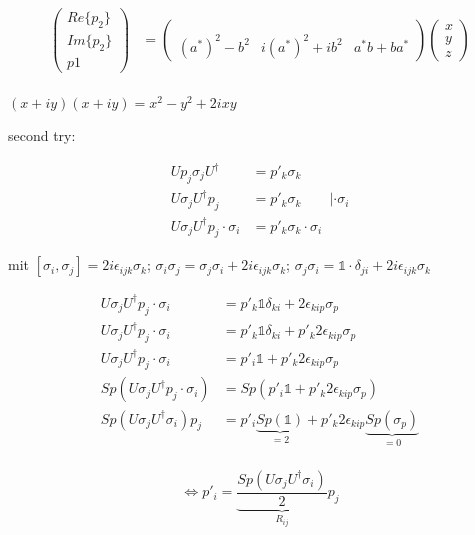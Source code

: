 \begin{enumerate}
\begin{align}
\begin{pmatrix}Re\{p_2\}\\Im\{p_2\}\\p1\end{pmatrix} &=
\begin{pmatrix} & & \\ & & \\(a^*)^2-b^2 &i(a^*)^2+ib^2 & a^*b+ba^*\end{pmatrix}
\begin{pmatrix}x\\y\\z\end{pmatrix} \\
\end{align}

\((x+iy)(x+iy) = x^2-y^2+2ixy\) 


second try:


\begin{align}
Up_j\sigma_j U^\dagger &= p'_k\sigma_k \\
U\sigma_j U^\dagger p_j &= p'_k\sigma_k\qquad |\cdot \sigma_i \\
U\sigma_j U^\dagger p_j \cdot \sigma_i &= p'_k\sigma_k\cdot \sigma_i
\end{align}

mit \([\sigma_i,\sigma_j]=2i\epsilon_{ijk}\sigma_k\);  \(\sigma_i\sigma_j=\sigma_j\sigma_i+2i\epsilon_{ijk}\sigma_k\); \(\sigma_j\sigma_i = \mathbb 1\cdot \delta_{ji}+2i\epsilon_{ijk}\sigma_k\)

\begin{align}
U\sigma_j U^\dagger p_j \cdot \sigma_i &= p'_k\mathbb 1 \delta_{ki}+2\epsilon_{kip}\sigma_p\\
U\sigma_j U^\dagger p_j \cdot \sigma_i &= p'_k\mathbb 1 \delta_{ki}+p'_k2\epsilon_{kip}\sigma_p\\
U\sigma_j U^\dagger p_j \cdot \sigma_i &= p'_i\mathbb 1 + p'_k2\epsilon_{kip}\sigma_p\\
Sp(U\sigma_j U^\dagger p_j \cdot \sigma_i) &= Sp(p'_i\mathbb 1 + p'_k2\epsilon_{kip}\sigma_p)\\
Sp(U\sigma_j U^\dagger\sigma_i)p_j &= p'_i \underbrace{Sp(\mathbb 1)}_{=2} + p'_k2\epsilon_{kip}\underbrace{Sp(\sigma_p)}_{=0}\\
\end{align}

\[ \Leftrightarrow p'_i = \underbrace{\frac{Sp(U\sigma_j U^\dagger\sigma_i)}{2}}_{R_{ij}}p_j\]




\end{enumerate}







